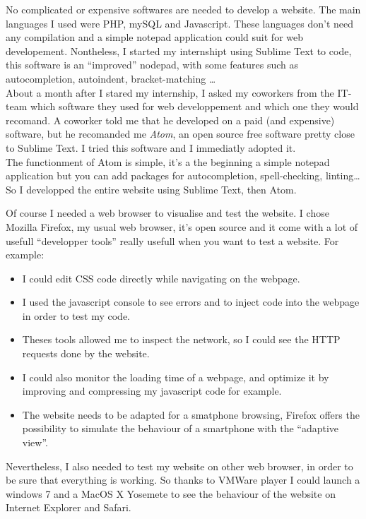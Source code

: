 \documentclass[10pt,a4paper]{article}
\begin{document}
No complicated or expensive softwares are needed to develop a website. The main languages I used were PHP, mySQL and Javascript. These languages don't need any compilation and a simple notepad application could suit for web developement. Nontheless, I started my internshipt using Sublime Text to code, this software is an ``improved'' nodepad, with some features such as autocompletion, autoindent, bracket-matching \ldots \\
About a month after I stared my internship, I asked my coworkers from the IT-team which software they used for web developpement and which one they would recomand. A coworker told me that he developed on a paid (and expensive) software, but he recomanded me \textit{Atom}, an open source free software pretty close to Sublime Text. I tried this software and I immediatly adopted it.\\
The functionment of Atom is simple, it's a the beginning a simple notepad application but you can add packages for autocompletion, spell-checking, linting\ldots \\
So I developped the entire website using Sublime Text, then Atom.


Of course I needed a web browser to visualise and test the website. I chose Mozilla Firefox, my usual web browser, it's open source and it come with a lot of usefull ``developper tools'' really usefull when you want to test a website. For example:
\begin{itemize}
\item I could edit CSS code directly while navigating on the webpage.
\item I used the javascript console to see errors and to inject code into the webpage in order to test my code.
\item Theses tools allowed me to inspect the network, so I could see the HTTP requests done by the website.
\item I could also monitor the loading time of a webpage, and optimize it by improving and compressing my javascript code for example.
\item The website needs to be adapted for a smatphone browsing, Firefox offers the possibility to simulate the behaviour of a smartphone with the ``adaptive view''.
\end{itemize}

Nevertheless, I also needed to test my website on other web browser, in order to be sure that everything is working. So thanks to VMWare player I could launch a windows 7 and a MacOS X Yosemete to see the behaviour of the website on Internet Explorer and Safari.
\end{document}
